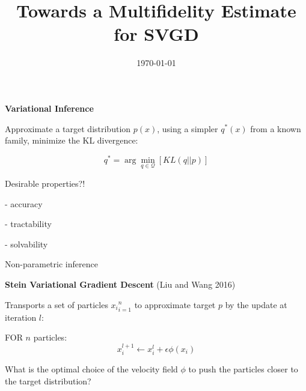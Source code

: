 \documentclass[usenames,dvipsnames]{beamer}
\title[Seminar]{Towards a Multifidelity Estimate for SVGD}
\date{\today}
\theoremstyle{definition}
\begin{document}
\begin{frame}
\titlepage %
\end{frame}




     


\begin{frame}
    \textbf{Variational Inference}

    Approximate a target distribution $p(x)$, using a simpler $q^{\ast}(x)$ from a known family, minimize the KL divergence:

    $$q^{\ast} = \arg \min_{q \in \mathcal{Q}}[KL(q || p)]$$

    Desirable properties?!

    - accuracy

    - tractability

    - solvability
\end{frame}




\begin{frame}{Non-parametric inference}

\textbf{Stein Variational Gradient Descent}
(Liu and Wang 2016)

Transports a set of particles ${x_i}_{i=1}^{n}$ to approximate target $p$ by the update at iteration $l$:

FOR $n$ particles:
    $$x_i^{l+1} \leftarrow x_i^{l} + \epsilon \phi(x_i)$$

What is the optimal choice of the velocity field $\phi$ to push the particles closer to the target distribution?

\end{frame}
\end{document}
